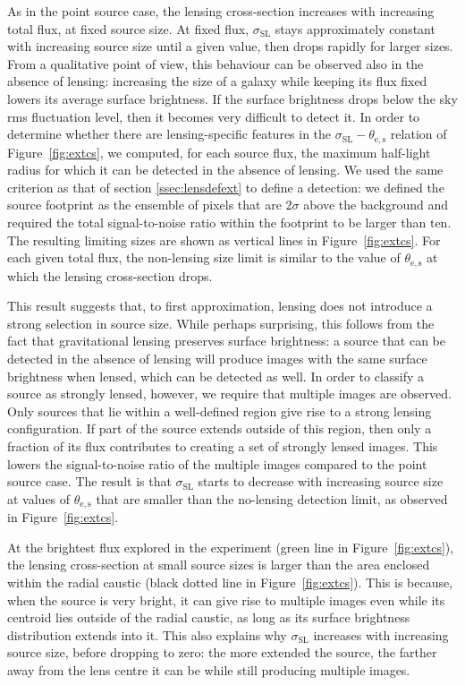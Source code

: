 \documentclass{aa}
\def\crosssect{\sigma_\mathrm{{SL}}}
\def\Fref#1{Figure~\ref{#1}\xspace}
\begin{document}
As in the point source case, the lensing cross-section increases with increasing total flux, at fixed source size.
At fixed flux, $\crosssect$ stays approximately constant with increasing source size until a given value, then drops rapidly for larger sizes.
From a qualitative point of view, this behaviour can be observed also in the absence of lensing: increasing the size of a galaxy while keeping its flux fixed lowers its average surface brightness. If the surface brightness drops below the sky rms fluctuation level, then it becomes very difficult to detect it.
In order to determine whether there are lensing-specific features in the $\crosssect-\theta_{\mathrm{e,s}}$ relation of \Fref{fig:extcs}, we computed, for each source flux, the maximum half-light radius for which it can be detected in the absence of lensing.
We used the same criterion as that of section \ref{ssec:lensdefext} to define a detection: we defined the source footprint as the ensemble of pixels that are $2\sigma$ above the background and required the total signal-to-noise ratio within the footprint to be larger than ten.
The resulting limiting sizes are shown as vertical lines in \Fref{fig:extcs}. For each given total flux, the non-lensing size limit is similar to the value of $\theta_{\mathrm{e,s}}$ at which the lensing cross-section drops.

This result suggests that, to first approximation, lensing does not introduce a strong selection in source size.
While perhaps surprising, this follows from the fact that gravitational lensing preserves surface brightness: a source that can be detected in the absence of lensing will produce images with the same surface brightness when lensed, which can be detected as well.
In order to classify a source as strongly lensed, however, we require that multiple images are observed. 
Only sources that lie within a well-defined region give rise to a strong lensing configuration.
If part of the source extends outside of this region, then only a fraction of its flux contributes to creating a set of strongly lensed images.
This lowers the signal-to-noise ratio of the multiple images compared to the point source case.
The result is that $\crosssect$ starts to decrease with increasing source size at values of $\theta_{\mathrm{e,s}}$ that are smaller than the no-lensing detection limit, as observed in \Fref{fig:extcs}.

At the brightest flux explored in the experiment (green line in \Fref{fig:extcs}), the lensing cross-section at small source sizes is larger than the area enclosed within the radial caustic (black dotted line in \Fref{fig:extcs}).
This is because, when the source is very bright, it can give rise to multiple images even while its centroid lies outside of the radial caustic, as long as its surface brightness distribution extends into it.
This also explains why $\crosssect$ increases with increasing source size, before dropping to zero: the more extended the source, the farther away from the lens centre it can be while still producing multiple images.
\end{document}
